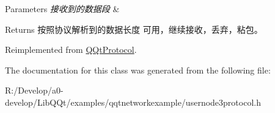 \begin{DoxyParams}{Parameters}
{\em 接收到的数据段} & \\
\hline
\end{DoxyParams}
\begin{DoxyReturn}{Returns}
按照协议解析到的数据长度 可用，继续接收，丢弃，粘包。 
\end{DoxyReturn}


Reimplemented from \mbox{\hyperlink{class_q_qt_protocol_a00fd0c1ac23379ed3b9b25da9a34f39b}{Q\+Qt\+Protocol}}.



The documentation for this class was generated from the following file\+:\begin{DoxyCompactItemize}
\item 
R\+:/\+Develop/a0-\/develop/\+Lib\+Q\+Qt/examples/qqtnetworkexample/usernode3protocol.\+h\end{DoxyCompactItemize}
